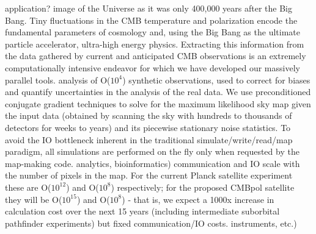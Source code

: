 \documentclass[times]{cpeauth}
\begin{document}
%
application?
%
image of the Universe as it was only 400,000 years after the Big Bang. Tiny
fluctuations in the CMB temperature and polarization encode the fundamental
parameters of cosmology and, using the Big Bang as the ultimate particle
accelerator, ultra-high energy physics. Extracting this information from the
data gathered by current and anticipated CMB observations is an extremely
computationally intensive endeavor for which we have developed our massively
parallel tools.
%
%
analysis of O($10^4$) synthetic observations, used to correct for biases and
quantify uncertainties in the analysis of the real data. We use preconditioned
conjugate gradient techniques to solve for the maximum likelihood sky map given
the input data (obtained by scanning the sky with hundreds to thousands of
detectors for weeks to years) and its piecewise stationary noise statistics. To
avoid the IO bottleneck inherent in the traditional simulate/write/read/map
paradigm, all simulations are performed on the fly only when requested by the
map-making code.
%
%
analytics, bioinformatics)
%
%
%
%
%
communication and IO scale with the number of pixels in the map. For the current
Planck satellite experiment these are O($10^12$) and O($10^8$) respectively; for
the proposed CMBpol satellite they will be O($10^15$) and O($10^8$) - that is,
we expect a 1000x increase in calculation cost over the next 15 years (including
intermediate suborbital pathfinder experiments) but fixed communication/IO
costs.
%
instruments, etc.)
%
\end{document}
